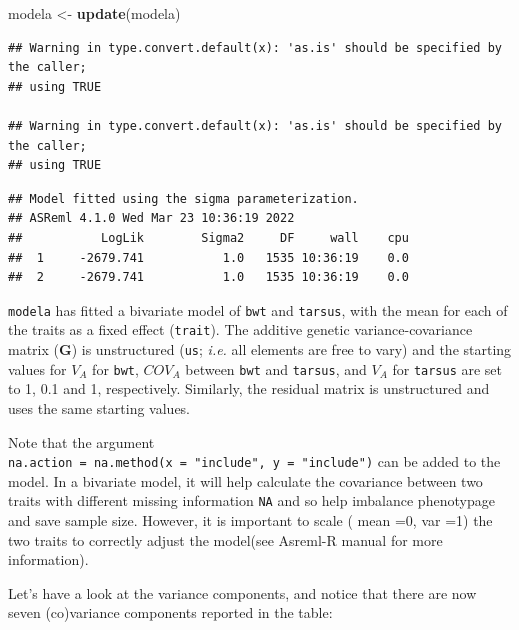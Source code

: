 \documentclass[
  12pt,
]{book}
\newenvironment{Shaded}{\begin{snugshade}}{\end{snugshade}}
\newcommand{\KeywordTok}[1]{\textcolor[rgb]{0.13,0.29,0.53}{\textbf{#1}}}
\newcommand{\NormalTok}[1]{#1}
\newcommand{\OperatorTok}[1]{\textcolor[rgb]{0.81,0.36,0.00}{\textbf{#1}}}
\newcommand{\StringTok}[1]{\textcolor[rgb]{0.31,0.60,0.02}{#1}}
\begin{document}
\begin{Shaded}
\begin{Highlighting}[]
\NormalTok{modela \textless{}{-}}\StringTok{ }\KeywordTok{update}\NormalTok{(modela)}
\end{Highlighting}
\end{Shaded}

\begin{verbatim}
## Warning in type.convert.default(x): 'as.is' should be specified by the caller;
## using TRUE

## Warning in type.convert.default(x): 'as.is' should be specified by the caller;
## using TRUE
\end{verbatim}

\begin{verbatim}
## Model fitted using the sigma parameterization.
## ASReml 4.1.0 Wed Mar 23 10:36:19 2022
##           LogLik        Sigma2     DF     wall    cpu
##  1     -2679.741           1.0   1535 10:36:19    0.0
##  2     -2679.741           1.0   1535 10:36:19    0.0
\end{verbatim}

\texttt{modela} has fitted a bivariate model of \texttt{bwt} and \texttt{tarsus}, with the mean for each of the traits as a fixed effect (\texttt{trait}). The additive genetic variance-covariance matrix (\(\textbf{G}\)) is unstructured (\texttt{us}; \emph{i.e.} all elements are free to vary) and the starting values for \(V_A\) for \texttt{bwt}, \(COV_A\) between \texttt{bwt} and \texttt{tarsus}, and \(V_A\) for \texttt{tarsus} are set to 1, 0.1 and 1, respectively. Similarly, the residual matrix is unstructured and uses the same starting values.

Note that the argument \texttt{na.action\ =\ na.method(x\ =\ "include",\ y\ =\ "include")} can be added to the model. In a bivariate model, it will help calculate the covariance between two traits with different missing information \texttt{NA} and so help imbalance phenotypage and save sample size. However, it is important to scale ( mean =0, var =1) the two traits to correctly adjust the model(see Asreml-R manual for more information).

Let's have a look at the variance components, and notice that there are now seven (co)variance components reported in the table:

\begin{Shaded}
\end{Shaded}
\end{document}
